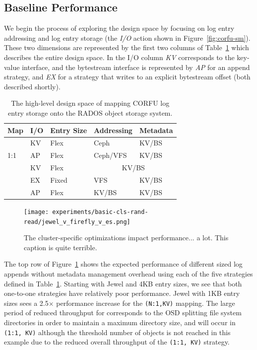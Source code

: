 \documentclass[10pt,twocolumn]{article}
\begin{document}
\subsection{Baseline Performance}

We begin the process of exploring the design space by focusing on log entry
addressing and log entry storage (the \emph{I/O} action shown in
Figure~\ref{fig:corfu-sm}).  These two dimensions are represented by the first
two columns of Table~\ref{tab:pd-map} which describes the entire design space.
In the I/O column \emph{KV} corresponds to the key-value interface, and the
bytestream interface is represented by \emph{AP} for an append strategy, and
\emph{EX} for a strategy that writes to an explicit bytestream offset (both
described shortly).

\begin{table}[h]
\begin{tabular}{ | l | l | l | l | l |}
\hline
Map & I/O & Entry Size & Addressing & Metadata \\ \hline
\multirow{3}{*}{1:1} & KV  & Flex     & Ceph      & KV/BS \\ \cline{2-5}
                     & AP  & Flex     & Ceph/VFS  & KV/BS \\ \hline
\multirow{4}{*}{N:1} & KV  & Flex     & \multicolumn{2}{|c|}{KV/BS} \\ \cline{2-5}
                     & EX  & Fixed    & VFS       & KV/BS \\ \cline{2-5}
                     & AP  & Flex     & KV/BS     & KV/BS \\
\hline
\end{tabular}
\caption{The high-level design space of mapping CORFU log entry storage onto
the RADOS object storage system.}
\label{tab:pd-map}
\end{table}

\begin{figure}[t]
	\centering
	\texttt{[image: experiments/basic-cls-rand-read/jewel\_v\_firefly\_v\_es.png]}
	\caption{The cluster-specific optimizations impact performance... a lot. This caption is quite terrible.
	\label{fig:jewel_v_firefly_v_es}}
\end{figure}

The top row of Figure~\ref{fig:jewel_v_firefly_v_es} shows the expected
performance of different sized log appends without metadata management overhead
using each of the five strategies defined in Table~\ref{tab:pd-map}.  Starting
with Jewel and 4KB entry sizes, we see that both one-to-one strategies have
relatively poor performance. Jewel with 1KB entry sizes sees a 2.5\(\times\)
performance increase for the \texttt{(N:1,KV)} mapping. The large period of reduced
throughput for corresponds to the OSD splitting file system directories in
order to maintain a maximum directory size, and will occur in \texttt{(1:1, KV)}
although the threshold number of objects is not reached in this example due to
the reduced overall throughput of the \texttt{(1:1, KV)} strategy.
\end{document}
